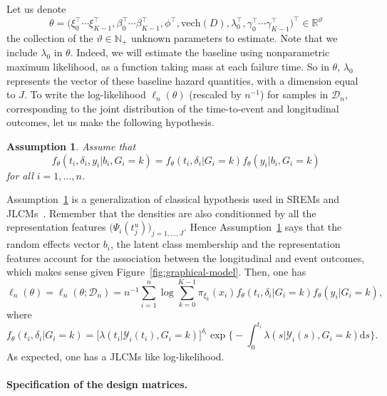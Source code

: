 \documentclass[11pt]{article}
\newtheorem{assumption}{Assumption}{\bf}{\rm}
\newcommand{\dd}{\mathrm{d}}
\newcommand{\cY}{\mathcal Y}
\newcommand{\cD}{\mathcal D}
\newcommand{\R}{\mathds R}
\newcommand{\N}{\mathds N}
\begin{document}
Let us denote 
\[ \theta = \big(\xi_0^\top \cdots \xi_{K-1}^\top, \beta_0^\top \cdots \beta_{K-1}^\top, \phi^\top, \text{vech}(D), \lambda_0^\top, \gamma_0^\top \cdots \gamma_{K-1}^\top\big)^\top \in \R^\vartheta \]
the collection of the $\vartheta \in \N_+$ unknown parameters to estimate. Note that we include $\lambda_0$ in $\theta$. Indeed, we will estimate the baseline using nonparametric maximum likelihood, as a function taking mass at each failure time. So in $\theta$, $\lambda_0$ represents the vector of these baseline hazard quantities, with a dimension equal to $J$.
To write the log-likelihood $\ell_n(\theta)$ (rescaled by $n^{-1}$)  for samples in $\cD_n$, corresponding to the joint distribution of the time-to-event and longitudinal outcomes, let us make the following hypothesis.
\begin{assumption}
\label{indep-hyp-3}
Assume that
\begin{equation}
  \label{eq:ind-hyp}
  f_\theta(t_i, \delta_i, y_i | b_i, G_i = k) = f_\theta(t_i, \delta_i| G_i = k) f_\theta(y_i | b_i, G_i = k)
\end{equation}
for all $i=1, \ldots, n$.
\end{assumption}
Assumption~\ref{indep-hyp-3} is a generalization of classical hypothesis used in SREMs and JLCMs~\citep{hickey2016joint}. Remember that the densities are also conditionned by all the representation features $\big(\Psi_i(t_j^u)\big)_{j=1,\ldots,J}$. Hence Assumption~\ref{indep-hyp-3} says that the random effects vector $b_i$, the latent class membership and the representation features account for the association between the longitudinal and event outcomes, which makes sense given Figure~\ref{fig:graphical-model}.
Then, one has
\begin{equation}
	\label{eq:log-lik}
	\ell_n(\theta) = \ell_n(\theta ; \cD_n) = n^{-1} \sum_{i=1}^n \log \sum_{k=0}^{K-1} \pi_{\xi_k}(x_i) f_\theta(t_i, \delta_i| G_i = k) f_\theta(y_i | G_i = k),
\end{equation}
where 
\[f_\theta(t_i, \delta_i| G_i = k) = \big[\lambda(t_i|\cY_i(t_i), G_i = k)\big]^{\delta_i} \exp \Big\{-\int_0^{t_i} \lambda(s|\cY_i(s), G_i = k) \dd s \Big\}. \]
As expected, one has a JLCMs like log-likelihood.

\paragraph{Specification of the design matrices.}
 
\end{document}
